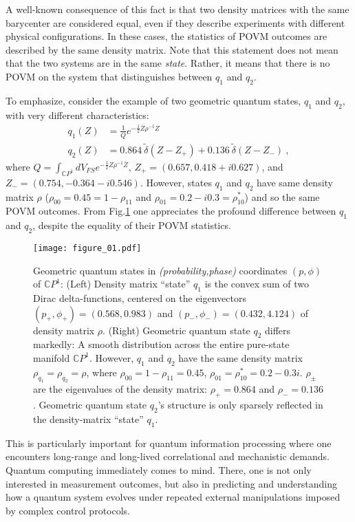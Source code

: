 \documentclass[nofootinbib,pre,twocolumn,showpacs,showkeys,groupaddress,preprintnumbers,floatfix]{revtex4-1}
\newcommand{\1}{\mathbbm{1}}
\begin{document}
A well-known consequence of this fact is that two density matrices with the
same barycenter are considered equal, even if they describe experiments with
different physical configurations. In these cases, the statistics of POVM
outcomes are described by the same density matrix. Note that this statement
does not mean that the two systems are in the same \emph{state}. Rather, it
means that there is no POVM on the system that distinguishes between $q_1$ and
$q_2$.

To emphasize, consider the example of two geometric quantum states, $q_1$ and
$q_2$, with very different characteristics:
\begin{align*}
q_1(Z) & = \frac{1}{Q} e^{-\frac{1}{2} \overline{Z}\rho^{-1}Z } \\
q_2(Z) & = 0.864~\tilde{\delta}(Z - Z_{+}) + 0.136~\tilde{\delta}(Z - Z_{-})
  ~,
\end{align*}
where $Q = \int_{\mathbb{C}P^1} dV_{FS} e^{-\frac{1}{2}Z \rho^{-1}
\overline{Z}}$, $Z_+ = (0.657,0.418 + i 0.627)$, and $Z_- =
(0.754,-0.364-i0.546)$. However, states $q_1$ and $q_2$ have same density
matrix $\rho$ ($\rho_{00} = 0.45 = 1- \rho_{11}$ and $\rho_{01} = 0.2 - i 0.3
= \rho_{10}^{*}$) and so the same POVM outcomes. From Fig.\ref{fig:Example}
one appreciates the profound difference between $q_1$ and $q_2$, despite the
equality of their POVM statistics.

\begin{figure}[h]
\centering
\texttt{[image: figure\_01.pdf]}
\caption{Geometric quantum states in \emph{(probability,phase)} coordinates
	$(p,\phi)$ of $\mathbb{C}P^1$: (Left) Density matrix ``state'' $q_1$ is the
	convex sum of two Dirac delta-functions, centered on the eigenvectors
	$(p_+,\phi_+) = (0.568,0.983) $ and $(p_-, \phi_-) = (0.432,4.124)$ of
	density matrix $\rho$. (Right) Geometric quantum state $q_2$ differs
	markedly: A smooth distribution across the entire pure-state manifold
	$\mathbb{C}P^1$. However, $q_1$ and $q_2$ have the same density matrix
	$\rho_{q_1} = \rho_{q_2} = \rho$, where $\rho_{00} = 1- \rho_{11} = 0.45$,
	$\rho_{01} = \rho_{10}^{*} = 0.2 - 0.3 i$. $\rho_{\pm}$ are the eigenvalues
	of the density matrix: $\rho_+ = 0.864$ and $\rho_{-}=0.136$. Geometric
	quantum state $q_2$'s structure is only sparsely reflected in the
	density-matrix ``state'' $q_1$.
	}
\label{fig:Example} 
\end{figure}

This is particularly important for quantum information processing where one
encounters long-range and long-lived correlational and mechanistic demands.
Quantum computing immediately comes to mind. There, one is not only interested
in measurement outcomes, but also in predicting and understanding how a quantum
system evolves under repeated external manipulations imposed by complex control
protocols.
\end{document}
